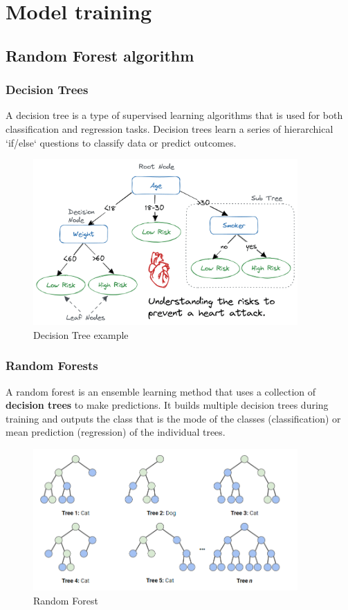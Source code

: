 \chapter{Model training}

\thispagestyle{empty}

\section{Random Forest algorithm}
\subsection{Decision Trees}
A decision tree is a type of supervised learning algorithms that is used for both classification and regression tasks. Decision trees learn a series of hierarchical `if/else` questions to classify data or predict outcomes.
\begin{figure}[h]
	\centering
	\includegraphics[width=0.9\textwidth]{./assets/images/decision_tree-examlpe.png}
	\caption{Decision Tree example}
\end{figure}
\subsection{Random Forests}
A random forest is an ensemble learning method that uses a collection of \textbf{decision trees} to make predictions. It builds multiple decision trees during training and outputs the class that is the mode of the classes (classification) or mean prediction (regression) of the individual trees.
\begin{figure}[h]
	\centering
	\includegraphics[width=0.9\textwidth]{./assets/images/Random forest.png}
	\caption{Random Forest}
\end{figure}

